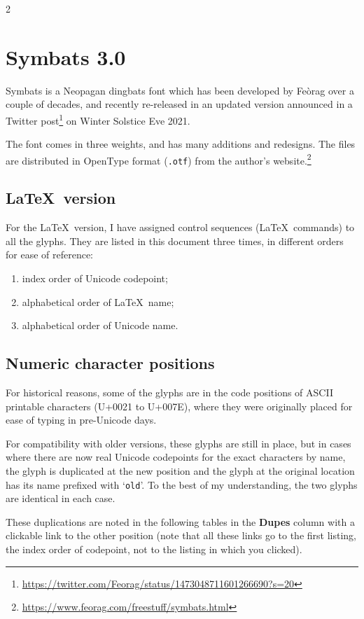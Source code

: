 \documentclass{article}
\begin{document}
\begin{multicols*}{2}
\large
\section{Symbats 3.0}
Symbats is a Neopagan dingbats font which has been developed by Feòrag
over a couple of decades, and recently re-released in an updated
version announced in a Twitter
post\footnote{\url{https://twitter.com/Feorag/status/1473048711601266690?s=20}}
on Winter Solstice Eve 2021.

The font comes in three weights, and has many additions and
redesigns. The files are distributed in OpenType format
(\texttt{.otf}) from the author's
website.\footnote{\url{https://www.feorag.com/freestuff/symbats.html}}\label{intro}

\subsection{\LaTeX\ version}

For the \LaTeX\ version, I have assigned control sequences
(\LaTeX\ commands) to all the glyphs. They are listed in this document
three times, in different orders for ease of reference:
\begin{enumerate}[nosep]
\item index order of Unicode codepoint;
\item alphabetical order of \LaTeX\ name;
\item alphabetical order of Unicode name.
\end{enumerate}

\subsection{Numeric character positions}\label{numpos}

For historical reasons, some of the glyphs are in the code positions
of ASCII printable characters (U+0021 to U+007E), where they were
originally placed for ease of typing in pre-Unicode days.

For compatibility with older versions, these glyphs are still in
place, but in cases where there are now real Unicode codepoints for the
exact characters by name, the glyph is duplicated at the new position
and the glyph at the original location has its name prefixed with
`\texttt{old}'. To the best of my understanding, the two glyphs are
identical in each case.

These duplications are noted in the following tables in the
\textbf{Dupes} column with a clickable link to the other position
(note that all these links go to the first listing, the index order of
codepoint, not to the listing in which you clicked).


\end{multicols*}
\end{document}
